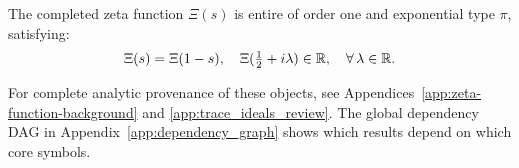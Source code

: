\noindent
The completed zeta function \( \Xi(s) \) is entire of order one and exponential type \( \pi \), satisfying:
\[
\Xi(s) = \Xi(1 - s), \quad \Xi(\tfrac{1}{2} + i\lambda) \in \mathbb{R}, \quad \forall\, \lambda \in \mathbb{R}.
\]

\medskip

\noindent
For complete analytic provenance of these objects, see Appendices~\ref{app:zeta-function-background} and \ref{app:trace_ideals_review}. The global dependency DAG in Appendix~\ref{app:dependency_graph} shows which results depend on which core symbols.
